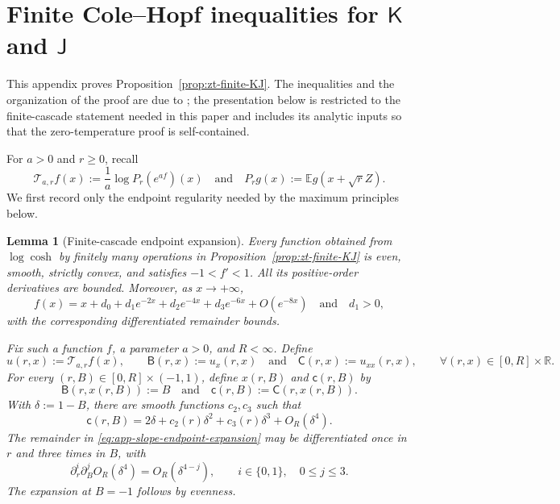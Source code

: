 \documentclass[10pt]{amsart}
\newtheorem{lemma}[lemma]{Lemma}
\theoremstyle{definition}
\theoremstyle{remark}
\numberwithin{equation}{section}
\newcommand{\R}{\mathbb R}
\newcommand{\E}{\mathbb E}
\newcommand{\1}{\mathbf 1}
\begin{document}
\section{\texorpdfstring{Finite Cole--Hopf inequalities for $\mathsf K$ and $\mathsf J$}{Finite Cole--Hopf inequalities for K and J}}
\label{app:finite-KJ}

This appendix proves Proposition~\ref{prop:zt-finite-KJ}. The inequalities and the organization of the proof are due to \cite[Section~3]{Lopatto2026v2}; the presentation below is restricted to the finite-cascade statement needed in this paper and includes its analytic inputs so that the zero-temperature proof is self-contained.

For $a>0$ and $r\geq0$, recall
\begin{equation}
 \mathcal T_{a,r}f(x)
 :=\frac1a\log P_r(e^{af})(x)
 \quad\text{and}\quad
 P_rg(x):=\E g(x+\sqrt r Z).
 \label{eq:app-Cole-Hopf}
\end{equation}
We first record only the endpoint regularity needed by the maximum principles below.

\begin{lemma}[Finite-cascade endpoint expansion]
\label{lem:app-endpoint-expansion}
Every function obtained from $\log\cosh$ by finitely many operations in Proposition~\ref{prop:zt-finite-KJ} is even, smooth, strictly convex, and satisfies $-1<f'<1$. All its positive-order derivatives are bounded. Moreover, as $x\to+\infty$,
\begin{equation}
 f(x)=x+d_0+d_1e^{-2x}+d_2e^{-4x}+d_3e^{-6x}
 +O(e^{-8x})\quad\text{and}\quad d_1>0,
 \label{eq:app-spatial-expansion}
\end{equation}
with the corresponding differentiated remainder bounds.

Fix such a function $f$, a parameter $a>0$, and $R<\infty$. Define
\begin{equation*}
 u(r,x):=\mathcal T_{a,r}f(x),\qquad \mathsf B(r,x):=u_x(r,x)
 \quad\text{and}\quad \mathsf C(r,x):=u_{xx}(r,x),
 \qquad \forall (r,x)\in[0,R]\times\R.
\end{equation*}
For every $(r,B)\in[0,R]\times(-1,1)$, define $x(r,B)$ and $\mathsf c(r,B)$ by
\begin{equation*}
 \mathsf B(r,x(r,B)):=B\quad\text{and}\quad \mathsf c(r,B):=\mathsf C(r,x(r,B)).
\end{equation*}
With $\delta:=1-B$, there are smooth functions $c_2,c_3$ such that
\begin{equation}
 \mathsf c(r,B)=2\delta+c_2(r)\delta^2+c_3(r)\delta^3
 +O_R(\delta^4).
 \label{eq:app-slope-endpoint-expansion}
\end{equation}
The remainder in \eqref{eq:app-slope-endpoint-expansion} may be differentiated once in $r$ and three times in $B$, with
\begin{equation}
 \partial_r^i\partial_B^jO_R(\delta^4)
 =O_R(\delta^{4-j}),
 \qquad i\in\{0,1\},\quad 0\leq j\leq3.
 \label{eq:app-slope-endpoint-remainder}
\end{equation}
The expansion at $B=-1$ follows by evenness.
\end{lemma}
\end{document}
